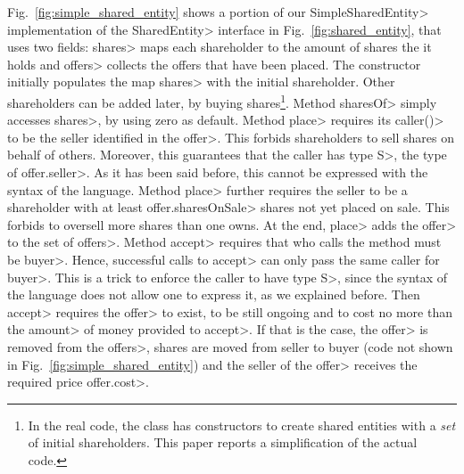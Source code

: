 Fig.~\ref{fig:simple_shared_entity} shows a portion of our \<SimpleSharedEntity>
implementation of the \<SharedEntity> interface in Fig.~\ref{fig:shared_entity}, that
uses two fields: \<shares> maps each shareholder to the amount of shares the it holds and
\<offers> collects the offers that have been placed.
The constructor initially populates the map \<shares> with the initial shareholder.
Other shareholders can be added later, by buying shares\footnote{In the real code, the class has
  constructors to create shared entities with a \emph{set} of initial shareholders. This paper
  reports a simplification of the actual code.}.
Method \<sharesOf> simply accesses
\<shares>, by using zero as default. Method \<place> requires its \<caller()> to be
the seller identified in the \<offer>. This forbids shareholders to sell shares on behalf of others.
Moreover, this guarantees that the caller has type \<S>, the type of \<offer.seller>.
As it has been said before, this cannot be expressed with the syntax of the language.
Method \<place> further requires the seller to be a shareholder with at least \<offer.sharesOnSale>
shares not yet placed on sale. This forbids to oversell more shares
than one owns. At the end, \<place> adds the \<offer> to the set of \<offers>.
Method \<accept> requires that who calls the method must be \<buyer>. Hence, successful
calls to \<accept> can only pass the same caller for \<buyer>. This is a trick to enforce the
caller to have type \<S>, since the syntax of the language does not allow one to express it,
as we explained before. Then \<accept> requires the \<offer> to exist, to be still ongoing
and to cost no more than the \<amount> of money provided to \<accept>. If that is the case,
the \<offer> is removed from the \<offers>, shares are moved from seller to buyer (code not
shown in Fig.~\ref{fig:simple_shared_entity}) and the seller of the \<offer>
receives the required price \<offer.cost>.
